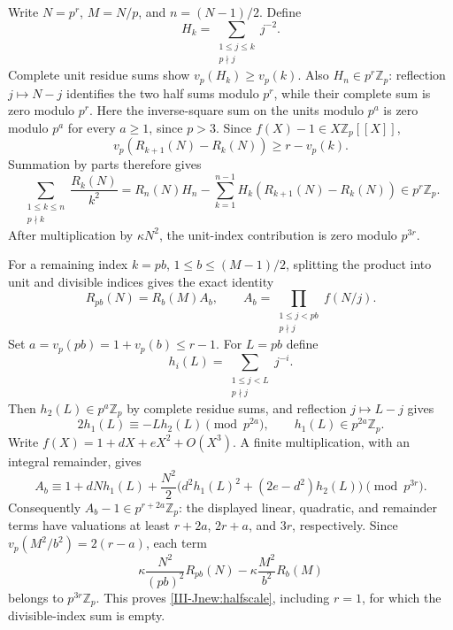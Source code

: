 \documentclass[11pt,letterpaper]{article}
\numberwithin{equation}{section}
\begin{document}
Write $N=p^r$, $M=N/p$, and $n=(N-1)/2$. Define
\[
 H_k=\sum_{\substack{1\le j\le k\\p\nmid j}}j^{-2}.
\]
Complete unit residue sums show $v_p(H_k)\ge v_p(k)$.
Also $H_n\in p^r\mathbb Z_p$: reflection $j\mapsto N-j$
identifies the two half sums modulo $p^r$, while their complete sum
is zero modulo $p^r$. Here the inverse-square sum on the units modulo
$p^a$ is zero modulo $p^a$ for every $a\ge1$, since $p>3$.
Since $f(X)-1\in X\mathbb Z_p[[X]]$,
\[
 v_p(R_{k+1}(N)-R_k(N))\ge r-v_p(k).
\]
Summation by parts therefore gives
\[
 \sum_{\substack{1\le k\le n\\p\nmid k}}\frac{R_k(N)}{k^2}
 =R_n(N)H_n-\sum_{k=1}^{n-1}H_k(R_{k+1}(N)-R_k(N))
 \in p^r\mathbb Z_p.
\]
After multiplication by $\kappa N^2$, the unit-index contribution
is zero modulo $p^{3r}$.

For a remaining index $k=pb$, $1\le b\le(M-1)/2$, splitting the
product into unit and divisible indices gives the exact identity
\[
 R_{pb}(N)=R_b(M)A_b,\qquad
 A_b=\prod_{\substack{1\le j<pb\\p\nmid j}}f(N/j).
\]
Set $a=v_p(pb)=1+v_p(b)\le r-1$. For $L=pb$ define
\[
 h_i(L)=\sum_{\substack{1\le j<L\\p\nmid j}}j^{-i}.
\]
Then $h_2(L)\in p^a\mathbb Z_p$ by complete residue sums, and
reflection $j\mapsto L-j$ gives
\[
 2h_1(L)\equiv-Lh_2(L)\pmod{p^{2a}},
 \qquad h_1(L)\in p^{2a}\mathbb Z_p.
\]
Write $f(X)=1+dX+eX^2+O(X^3)$. A finite multiplication, with an
integral remainder, gives
\[
 A_b\equiv1+dNh_1(L)+\frac{N^2}{2}
 \bigl(d^2h_1(L)^2+(2e-d^2)h_2(L)\bigr)
 \pmod{p^{3r}}.
\]
Consequently $A_b-1\in p^{r+2a}\mathbb Z_p$: the displayed
linear, quadratic, and remainder terms have valuations at least
$r+2a$, $2r+a$, and $3r$, respectively. Since
$v_p(M^2/b^2)=2(r-a)$, each term
\[
 \kappa\frac{N^2}{(pb)^2}R_{pb}(N)
 -\kappa\frac{M^2}{b^2}R_b(M)
\]
belongs to $p^{3r}\mathbb Z_p$. This proves
\eqref{III-Jnew:halfscale}, including $r=1$, for which the divisible-index
sum is empty.
\end{document}
